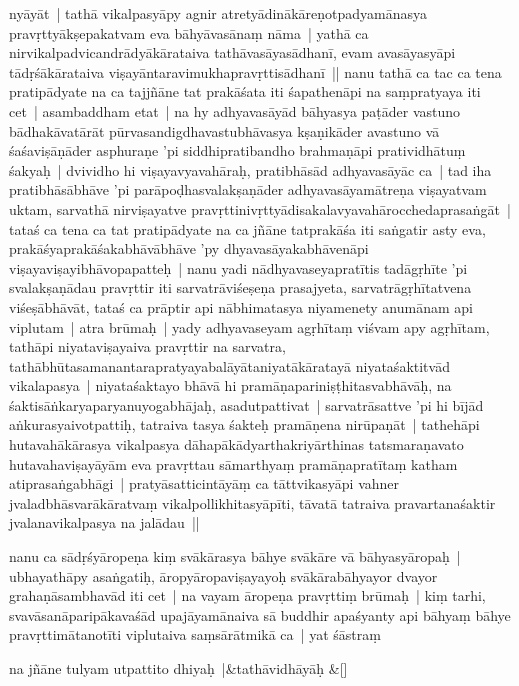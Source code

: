 \documentclass[article,12pt,a4paper]{memoir}
\begin{document}
	  \pstart nyāyāt | tathā vikalpasyāpy agnir atretyādinākāreṇotpadyamānasya pravṛttyākṣepakatvam eva bāhyāvasānaṃ nāma | yathā ca nirvikalpadvicandrādyākārataiva tathāvasāyasādhanī, evam avasāyasyāpi tādṛśākārataiva viṣayāntaravimukhapravṛttisādhanī || \label{thakur75-137.25} nanu tathā ca tac ca tena pratipādyate na ca tajjñāne tat prakāśata iti śapathenāpi na saṃpratyaya iti cet | asambaddham etat | na hy adhyavasāyād bāhyasya paṭāder vastuno bādhakāvatārāt pūrvasandigdhavastubhāvasya kṣaṇikāder avastuno vā śaśaviṣāṇāder asphuraṇe 'pi siddhipratibandho brahmaṇāpi pratividhātuṃ śakyaḥ | dvividho hi viṣayavyavahāraḥ, pratibhāsād adhyavasāyāc ca | tad iha pratibhāsābhāve 'pi parāpoḍhasvalakṣaṇāder adhyavasāyamātreṇa viṣayatvam uktam, sarvathā nirviṣayatve pravṛttinivṛttyādisakalavyavahārocchedaprasaṅgāt | tataś ca tena ca tat pratipādyate na ca jñāne tatprakāśa iti saṅgatir asty eva, prakāśyaprakāśakabhāvābhāve 'py dhyavasāyakabhāvenāpi viṣayaviṣayibhāvopapatteḥ | \label{thakur75-138.1} nanu yadi nādhyavaseyapratītis tadāgṛhīte 'pi svalakṣaṇādau pravṛttir iti sarvatrāviśeṣeṇa prasajyeta, sarvatrāgṛhītatvena viśeṣābhāvāt, tataś ca prāptir api nābhimatasya niyamenety anumānam api viplutam | atra brūmaḥ | yady adhyavaseyam agṛhītaṃ viśvam apy agṛhītam, tathāpi niyataviṣayaiva pravṛttir na sarvatra, tathābhūtasamanantarapratyayabalāyātaniyatākāratayā niyataśaktitvād vikalapasya | niyataśaktayo bhāvā hi pramāṇapariniṣṭhitasvabhāvāḥ, na śaktisāṅkaryaparyanuyogabhājaḥ, asadutpattivat | sarvatrāsattve 'pi hi bījād aṅkurasyaivotpattiḥ, tatraiva tasya śakteḥ pramāṇena nirūpaṇāt | tathehāpi hutavahākārasya vikalpasya dāhapākādyarthakriyārthinas tatsmaraṇavato hutavahaviṣayāyām eva pravṛttau sāmarthyaṃ pramāṇapratītaṃ katham atiprasaṅgabhāgi | pratyāsatticintāyāṃ ca tāttvikasyāpi vahner jvaladbhāsvarākā\label{capv-np-13a-start}ratvaṃ vikalpollikhitasyāpīti, tāvatā tatraiva pravartanaśaktir jvalanavikalpasya na jalādau ||
	\pend
      

	  \pstart nanu ca sādṛśyāropeṇa kiṃ svākārasya bāhye svākāre vā bāhyasyāropaḥ | ubhayathāpy asaṅgatiḥ, āropyāropaviṣayayoḥ svākārabāhyayor dvayor grahaṇāsambhavād iti cet | na vayam āropeṇa pravṛttiṃ brūmaḥ | kiṃ tarhi, svavāsanāparipākavaśād upajāyamānaiva sā buddhir apaśyanty api bāhyaṃ bāhye pravṛttimātanotīti viplutaiva saṃsārātmikā ca | yat śāstraṃ 
	\pend
      
	    
	    \stanza[\smallbreak]
	na jñāne tulyam utpattito dhiyaḥ |&tathāvidhāyāḥ \&[\smallbreak]
\end{document}
